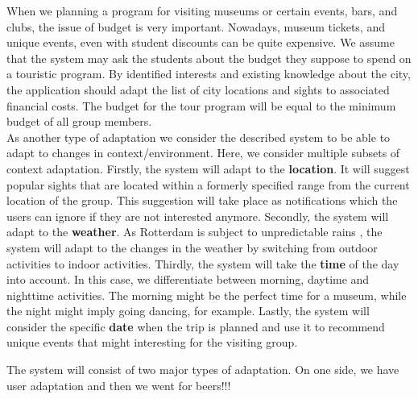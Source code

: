 \documentclass[12pt,a4paper,oneside]{article}
\begin{document}
When we planning a program for visiting museums or certain events, bars, and clubs, the issue of budget is very important. Nowadays, museum tickets, and unique events, even with student discounts can be quite expensive. We assume that the system may ask the students about the budget they suppose to spend on a touristic program. By identified interests and existing knowledge about the city, the application should adapt the list of city locations and sights to associated financial costs. The budget for the tour program will be equal to the minimum budget of all group members. \\


\indent As another type of adaptation we consider the described system to be able to adapt to changes in context/environment. Here, we consider multiple subsets of context adaptation. Firstly, the system will adapt to the \textbf{location}. It will suggest popular sights that are located within a formerly specified range from the current location of the group. This suggestion will take place as notifications which the users can ignore if they are not interested anymore. Secondly, the system will adapt to the \textbf{weather}. As Rotterdam is subject to unpredictable rains \cite{creemers2015meteorological}, the system will adapt to the changes in the weather by switching from outdoor activities to indoor activities. Thirdly, the system will take the \textbf{time} of the day into account. In this case, we differentiate between morning, daytime and nighttime activities. The morning might be the perfect time for a museum, while the night might imply going dancing, for example. Lastly, the system will consider the specific \textbf{date} when the trip is planned and use it to recommend unique events that might interesting for the visiting group.

\indent The system will consist of two major types of adaptation. On one side, we have user adaptation and then we went for beers!!! 

\printbibliography
\newpage
\end{document}
